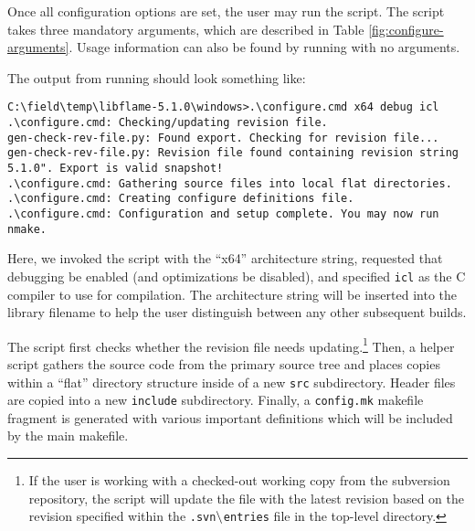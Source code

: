 
Once all configuration options are set, the user may run the \configurecmd
script.
The \configurecmd script takes three mandatory arguments, which are described
in Table \ref{fig:configure-arguments}.
Usage information can also be found by running \configurecmd with no
arguments.

The output from running \configurecmd should look something like:

\begin{Verbatim}[frame=single,framesep=2.5mm,xleftmargin=5mm,fontsize=\footnotesize]
C:\field\temp\libflame-5.1.0\windows>.\configure.cmd x64 debug icl
.\configure.cmd: Checking/updating revision file.
gen-check-rev-file.py: Found export. Checking for revision file...
gen-check-rev-file.py: Revision file found containing revision string 5.1.0". Export is valid snapshot!
.\configure.cmd: Gathering source files into local flat directories.
.\configure.cmd: Creating configure definitions file.
.\configure.cmd: Configuration and setup complete. You may now run nmake.
\end{Verbatim}

Here, we invoked the \configurecmd script with the ``x64'' architecture
string, requested that debugging be enabled (and optimizations be disabled),
and specified {\tt icl} as the C compiler to use for compilation.
The architecture string will be inserted into the library filename to help
the user distinguish between any other subsequent builds.

The \configurecmd script first checks whether the revision file needs
updating.\footnote{If the user is working with a checked-out working copy from
the  \libflame subversion repository, the script will update the file with the
latest revision based on the revision specified within the
{\tt .svn$\backslash$entries} file in the top-level \windows directory.}
Then, a helper script gathers the source code from the primary source tree and
places copies within a ``flat'' directory structure inside of a new {\tt src}
subdirectory.
Header files are copied into a new {\tt include} subdirectory.
Finally, a {\tt config.mk} makefile fragment is generated with various important
definitions which will be included by the main \nmake makefile.

